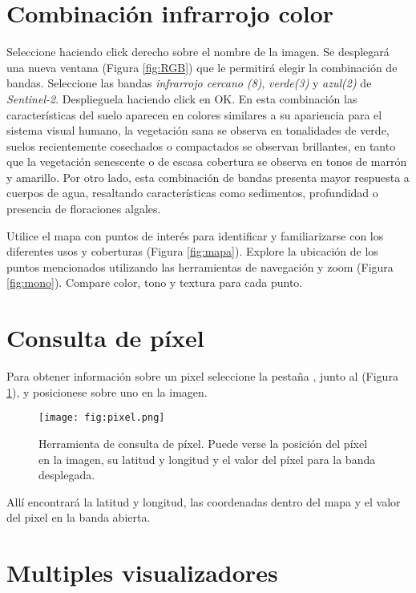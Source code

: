 \section{Combinación infrarrojo color}

Seleccione  haciendo click derecho sobre el nombre de la imagen. Se desplegará una nueva ventana (Figura \ref{fig:RGB}) que le permitirá elegir la combinación de bandas. Seleccione las bandas \emph{infrarrojo cercano (8)}, \emph{verde(3)} y \emph{azul(2)} de \emph{Sentinel-2}. Desplieguela haciendo click en OK. En esta combinación las características del suelo aparecen en colores similares a su apariencia para el sistema visual humano, la vegetación sana se observa en tonalidades de verde, suelos recientemente cosechados o compactados se observan brillantes, en tanto que la vegetación senescente o de escasa cobertura se observa en tonos de marrón y amarillo. Por otro lado, esta combinación de bandas presenta mayor respuesta a cuerpos de agua, resaltando características como sedimentos, profundidad o presencia de floraciones algales. 

Utilice el mapa con puntos de interés para identificar y familiarizarse con los diferentes usos y coberturas (Figura \ref{fig:mapa}). Explore la ubicación de los puntos mencionados utilizando las herramientas de navegación y zoom  (Figura \ref{fig:mono}). Compare color, tono y textura para cada punto. 

\section{Consulta de píxel}

Para obtener información sobre un pixel seleccione la pestaña , junto al  (Figura \ref{fig:pixel}), y posicionese  sobre uno en la imagen.

\begin{figure}[h!]
    \centering
    \texttt{[image: fig:pixel.png]}
    \caption{Herramienta de consulta de píxel. Puede verse la posición del píxel en la imagen, su latitud y longitud y el valor del píxel para la banda desplegada.}
    \label{fig:pixel}
\end{figure}

Allí encontrará la latitud y longitud, las coordenadas dentro del mapa y el valor del pixel en la banda abierta.

\section{Multiples visualizadores}

